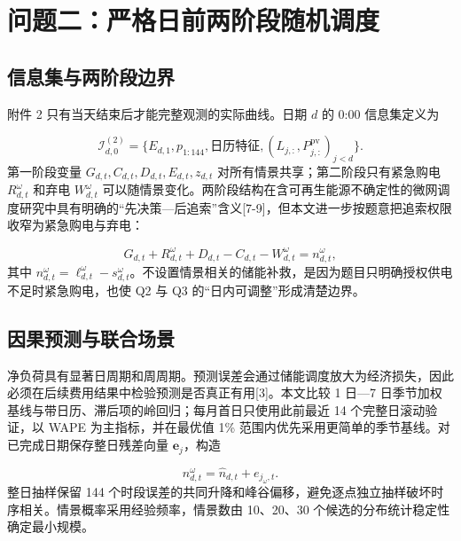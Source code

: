 \documentclass[12pt,a4paper]{ctexart}
\begin{document}
\section{问题二：严格日前两阶段随机调度}
\subsection{信息集与两阶段边界}
附件 2 只有当天结束后才能完整观测的实际曲线。日期 $d$ 的 0:00 信息集定义为\par
\begin{equation}
\mathcal I^{(2)}_{d,0}=\{E_{d,1},p_{1:144},\text{日历特征},
(L_{j,:},P^{\mathrm{pv}}_{j,:})_{j<d}\}.
\tag{8}
\end{equation}
第一阶段变量 $G_{d,t},C_{d,t},D_{d,t},E_{d,t},z_{d,t}$ 对所有情景共享；第二阶段只有紧急购电 $R^{\omega}_{d,t}$ 和弃电 $W^{\omega}_{d,t}$ 可以随情景变化。两阶段结构在含可再生能源不确定性的微网调度研究中具有明确的“先决策—后追索”含义[7-9]，但本文进一步按题意把追索权限收窄为紧急购电与弃电：\par
\begin{equation}
G_{d,t}+R^{\omega}_{d,t}+D_{d,t}-C_{d,t}-W^{\omega}_{d,t}
=n^{\omega}_{d,t},
\tag{9}
\end{equation}
其中 $n^{\omega}_{d,t}=\ell^{\omega}_{d,t}-s^{\omega}_{d,t}$。不设置情景相关的储能补救，是因为题目只明确授权供电不足时紧急购电，也使 Q2 与 Q3 的“日内可调整”形成清楚边界。\par
\subsection{因果预测与联合场景}
净负荷具有显著日周期和周周期。预测误差会通过储能调度放大为经济损失，因此必须在后续费用结果中检验预测是否真正有用[3]。本文比较 1 日—7 日季节加权基线与带日历、滞后项的岭回归；每月首日只使用此前最近 14 个完整日滚动验证，以 WAPE 为主指标，并在最优值 1\% 范围内优先采用更简单的季节基线。对已完成日期保存整日残差向量 $\mathbf e_j$，构造\par
\begin{equation}
n^{\omega}_{d,t}=\widehat n_{d,t}+e_{j_{\omega},t}.
\tag{10}
\end{equation}
整日抽样保留 144 个时段误差的共同升降和峰谷偏移，避免逐点独立抽样破坏时序相关。情景概率采用经验频率，情景数由 10、20、30 个候选的分布统计稳定性确定最小规模。\par
\end{document}
